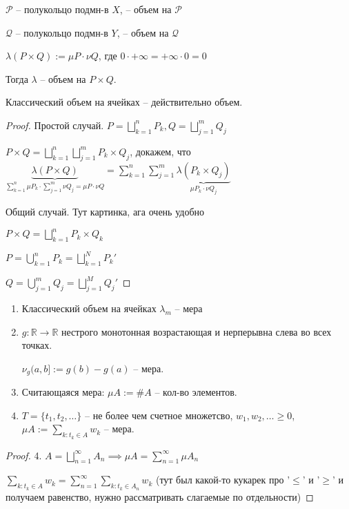 \begin{theorem}
    $\mathcal{P}$ -- полукольцо подмн-в $X$, \mu -- объем на $\mathcal{P}$

    $\mathcal{Q}$ -- полукольцо подмн-в $Y$, \nu -- объем на $\mathcal{Q}$

    $\lambda(P \times Q) := \mu P \cdot \nu Q$, где $0 \cdot +\infty = +\infty \cdot 0 = 0$

    Тогда $\lambda$ -- объем на $P \times Q$.
\end{theorem}
\begin{consequence}
    Классический объем на ячейках -- действительно объем.
\end{consequence}
\begin{proof}
    Простой случай. $P = \bigsqcup_{k=1}^{n}P_k, Q = \bigsqcup_{j=1}^m Q_j$

    $P \times Q = \bigsqcup_{k=1}^{n} \bigsqcup_{j=1}^{m} P_k \times Q_j$, докажем, что $\underbrace{\lambda (P \times Q)}_{\sum_{k=1}^n \mu P_k \cdot \sum_{j=1}^m \nu Q_j = \mu P \cdot \nu Q} = \sum_{k=1}^n \sum_{j=1}^m \underbrace{\lambda (P_k \times Q_j)}_{\mu P_k \cdot \nu Q_j}$

    Общий случай. Тут картинка, ага очень удобно

    $P \times Q = \bigsqcup_{k=1}^{n} P_k \times Q_k$
    
    $P = \bigcup_{k=1}^{n} P_k = \bigsqcup_{k=1}^{N} P_k'$

    $Q = \bigcup_{j=1}^{m} Q_j = \bigsqcup_{j=1}^{M} Q_j'$
\end{proof}

\begin{example}
    \begin{enumerate}
        \item Классический объем на ячейках $\lambda_m$ -- мера
        \item {
            $g : \mathbb{R} \rightarrow \mathbb{R}$ нестрого монотонная возрастающая и нерперывна слева во всех точках.

            $\nu_g (a, b]:=g(b) - g(a)$ -- мера.
        }
        \item Считающаяся мера: $\mu A := \#A$ -- кол-во элементов.
        \item $T = \{t_1, t_2, \dots \}$ -- не более чем счетное множетсво, $w_1, w_2, \dots \geq 0$, $\mu A := \sum_{k: t_k \in A} w_k$ -- мера.
    \end{enumerate}
\end{example}

\begin{proof}
    4. $A = \bigsqcup_{n=1}^{\infty} A_n \implies \mu A = \sum_{n=1}^{\infty} \mu A_n$

    $\sum_{k: t_k \in A} w_k = \sum_{n=1}^{\infty} \sum_{k: t_k \in A_n} w_k$ (тут был какой-то кукарек про '$\leq$' и '$\geq$' и получаем равенство, нужно рассматривать слагаемые по отдельности)
\end{proof}
